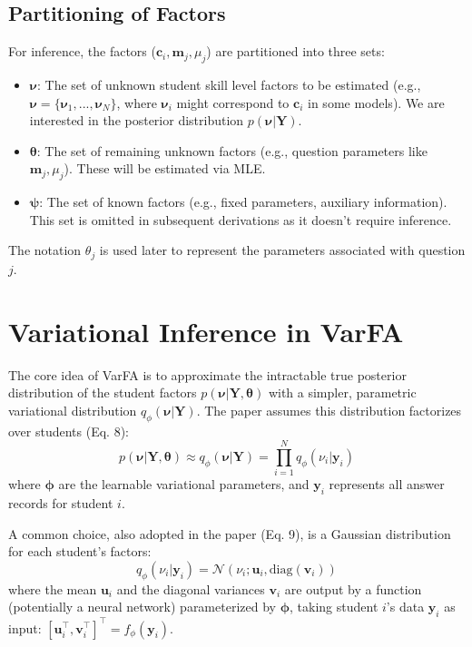 \documentclass[11pt, letterpaper]{article}
\newcommand{\vy}{\boldsymbol{y}} %
\newcommand{\vnu}{\boldsymbol{\nu}} %
\newcommand{\vtheta}{\boldsymbol{\theta}} %
\newcommand{\vphi}{\boldsymbol{\phi}} %
\newcommand{\vpsi}{\boldsymbol{\psi}} %
\newcommand{\vc}{\boldsymbol{c}} %
\newcommand{\vm}{\boldsymbol{m}} %
\newcommand{\vu}{\boldsymbol{u}} %
\newcommand{\vv}{\boldsymbol{v}} %
\newcommand{\mY}{\boldsymbol{Y}} %
\newcommand{\Ndist}{\mathcal{N}} %
\newcommand{\nuij}{\nu_{i}} %
\newcommand{\thetaj}{\theta_{j}} %
\begin{document}
\subsection{Partitioning of Factors}
For inference, the factors ($\vc_i, \vm_j, \mu_j$) are partitioned into three sets:
\begin{itemize}
    \item $\vnu$: The set of unknown student skill level factors to be estimated (e.g., $\vnu = \{\vnu_1, ..., \vnu_N\}$, where $\vnu_i$ might correspond to $\vc_i$ in some models). We are interested in the posterior distribution $p(\vnu | \mY)$.
    \item $\vtheta$: The set of remaining unknown factors (e.g., question parameters like $\vm_j, \mu_j$). These will be estimated via MLE.
    \item $\vpsi$: The set of known factors (e.g., fixed parameters, auxiliary information). This set is omitted in subsequent derivations as it doesn't require inference.
\end{itemize}
The notation $\thetaj$ is used later to represent the parameters associated with question $j$.

\section{Variational Inference in VarFA}

The core idea of VarFA is to approximate the intractable true posterior distribution of the student factors $p(\vnu | \mY, \vtheta)$ with a simpler, parametric variational distribution $q_{\phi}(\vnu | \mY)$. The paper assumes this distribution factorizes over students (Eq. 8):
\begin{equation}
    p(\vnu|\mY,\vtheta) \approx q_{\phi}(\vnu|\mY) = \prod_{i=1}^{N} q_{\phi}(\nuij | \vy_i)
    \label{eq:variational_approx}
\end{equation}
where $\vphi$ are the learnable variational parameters, and $\vy_i$ represents all answer records for student $i$.

A common choice, also adopted in the paper (Eq. 9), is a Gaussian distribution for each student's factors:
\begin{equation}
    q_{\phi}(\nuij | \vy_i) = \Ndist(\nuij; \vu_i, \text{diag}(\vv_i))
    \label{eq:variational_gaussian}
\end{equation}
where the mean $\vu_i$ and the diagonal variances $\vv_i$ are output by a function (potentially a neural network) parameterized by $\vphi$, taking student $i$'s data $\vy_i$ as input: $[\vu_i^{\top}, \vv_i^{\top}]^{\top} = f_{\phi}(\vy_i)$.
\end{document}
